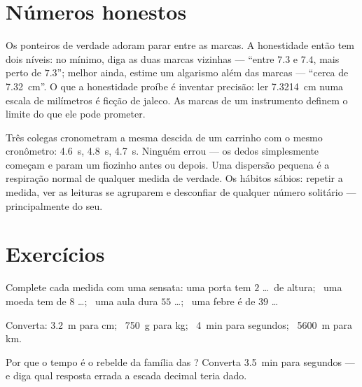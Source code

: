 \section{Números honestos}

\begin{remark}\label{rem:g6:measurement-in-science:between}
Os ponteiros de verdade adoram parar entre as marcas. A honestidade
então tem dois níveis: no mínimo, diga as duas marcas vizinhas ---
``entre $7.3$ e $7.4$, mais perto de $7.3$''; melhor ainda, estime um
algarismo além das marcas --- ``cerca de \qty{7.32}{cm}''. O que a
honestidade proíbe é inventar precisão: ler \qty{7.3214}{cm} numa
escala de milímetros é ficção de jaleco. As marcas de um instrumento
definem o limite do que ele pode prometer.
\end{remark}

\begin{example}\label{ex:g6:measurement-in-science:repeat}
Três colegas cronometram a mesma descida de um carrinho com o mesmo
cronômetro: \qty{4.6}{s}, \qty{4.8}{s}, \qty{4.7}{s}. Ninguém errou
--- os dedos simplesmente começam e param um fiozinho antes ou
depois. Uma dispersão pequena é a respiração normal de qualquer
medida de verdade. Os hábitos sábios: repetir a medida, ver as
leituras se agruparem e desconfiar de qualquer número solitário ---
principalmente do seu.
\end{example}

\section{Exercícios}

\begin{exercise}[$\star$]\label{exo:g6:measurement-in-science:1}
Complete cada medida com uma  sensata: uma porta tem $2$
\dots\ de altura; \ uma moeda tem  de $8$ \dots; \ uma aula dura
$55$ \dots; \ uma febre é de $39$ \dots
\end{exercise}

\begin{exercise}[$\star$]\label{exo:g6:measurement-in-science:2}
Converta: \qty{3.2}{m} para \unit{cm}; \ \qty{750}{g} para \unit{kg};
\ \qty{4}{min} para segundos; \ \qty{5600}{m} para \unit{km}.
\end{exercise}

\begin{exercise}[$\star$]\label{exo:g6:measurement-in-science:3}
Por que o tempo é o rebelde da família das ? Converta
\qty{3.5}{min} para segundos --- e diga qual resposta errada a escada
decimal teria dado.
\end{exercise}

